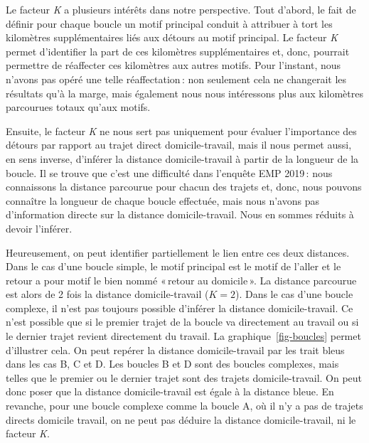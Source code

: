 \documentclass[
  9pt,
  a4paper,
  DIV=11]{scrreprt}
\begin{document}
Le facteur \emph{K} a plusieurs intérêts dans notre perspective. Tout
d'abord, le fait de définir pour chaque boucle un motif principal
conduit à attribuer à tort les kilomètres supplémentaires liés aux
détours au motif principal. Le facteur \emph{K} permet d'identifier la
part de ces kilomètres supplémentaires et, donc, pourrait permettre de
réaffecter ces kilomètres aux autres motifs. Pour l'instant, nous
n'avons pas opéré une telle réaffectation\,: non seulement cela ne
changerait les résultats qu'à la marge, mais également nous nous
intéressons plus aux kilomètres parcourues totaux qu'aux motifs.

Ensuite, le facteur \emph{K} ne nous sert pas uniquement pour évaluer
l'importance des détours par rapport au trajet direct domicile-travail,
mais il nous permet aussi, en sens inverse, d'inférer la distance
domicile-travail à partir de la longueur de la boucle. Il se trouve que
c'est une difficulté dans l'enquête EMP 2019\,: nous connaissons la
distance parcourue pour chacun des trajets et, donc, nous pouvons
connaître la longueur de chaque boucle effectuée, mais nous n'avons pas
d'information directe sur la distance domicile-travail. Nous en sommes
réduits à devoir l'inférer.

Heureusement, on peut identifier partiellement le lien entre ces deux
distances. Dans le cas d'une boucle simple, le motif principal est le
motif de l'aller et le retour a pour motif le bien nommé «\,retour au
domicile\,». La distance parcourue est alors de 2 fois la distance
domicile-travail (\(K=2\)). Dans le cas d'une boucle complexe, il n'est
pas toujours possible d'inférer la distance domicile-travail. Ce n'est
possible que si le premier trajet de la boucle va directement au travail
ou si le dernier trajet revient directement du travail. La
graphique~\ref{fig-boucles} permet d'illustrer cela. On peut repérer la
distance domicile-travail par les trait bleus dans les cas B, C et D.
Les boucles B et D sont des boucles complexes, mais telles que le
premier ou le dernier trajet sont des trajets domicile-travail. On peut
donc poser que la distance domicile-travail est égale à la distance
bleue. En revanche, pour une boucle complexe comme la boucle A, où il
n'y a pas de trajets directs domicile travail, on ne peut pas déduire la
distance domicile-travail, ni le facteur \emph{K}.
\end{document}

